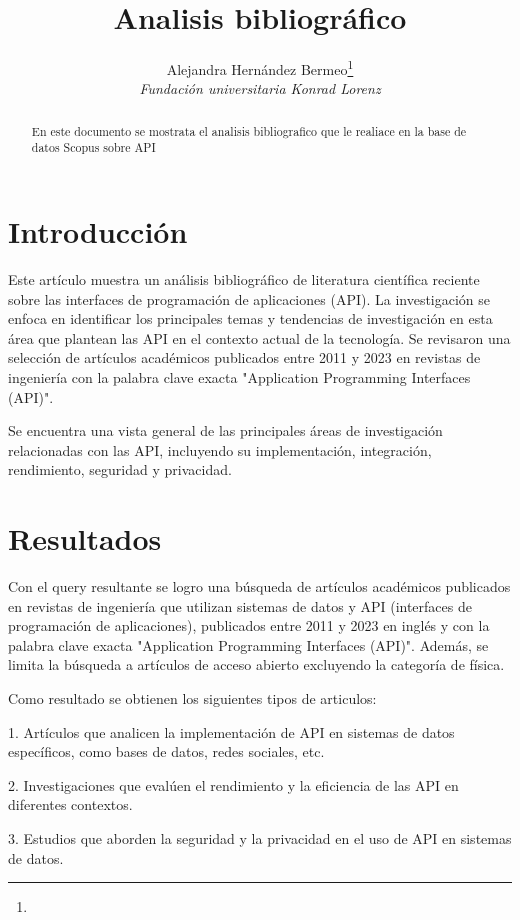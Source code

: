 \documentclass[journal, spanish]{IEEEtran}
\title{Analisis bibliográfico}
\author{Alejandra Hernández Bermeo\thanks{} \\
\textit{Fundación universitaria Konrad Lorenz} \\
}
\begin{document}
\maketitle

\begin{abstract}
En este documento se mostrata el analisis bibliografico que le realiace en la base de datos Scopus sobre API
\end{abstract}

\section{Introducción}
Este artículo muestra un análisis bibliográfico de literatura científica reciente sobre las interfaces de programación de aplicaciones (API). La investigación se enfoca en identificar los principales temas y tendencias de investigación en esta área que plantean las API en el contexto actual de la tecnología. Se revisaron una selección de artículos académicos publicados entre 2011 y 2023 en revistas de ingeniería con la palabra clave exacta "Application Programming Interfaces (API)".

Se encuentra una vista general de las principales áreas de investigación relacionadas con las API, incluyendo su implementación, integración, rendimiento, seguridad y privacidad.

\section{Resultados}
Con el query resultante se logro una búsqueda de artículos académicos publicados en revistas de ingeniería que utilizan sistemas de datos y API (interfaces de programación de aplicaciones), publicados entre 2011 y 2023 en inglés y con la palabra clave exacta "Application Programming Interfaces (API)". Además, se limita la búsqueda a artículos de acceso abierto excluyendo la categoría de física.

Como resultado se obtienen los siguientes tipos de articulos:

1. Artículos que analicen la implementación de API en sistemas de datos específicos, como bases de datos, redes sociales, etc.

2. Investigaciones que evalúen el rendimiento y la eficiencia de las API en diferentes contextos.

3. Estudios que aborden la seguridad y la privacidad en el uso de API en sistemas de datos.
\end{document}
